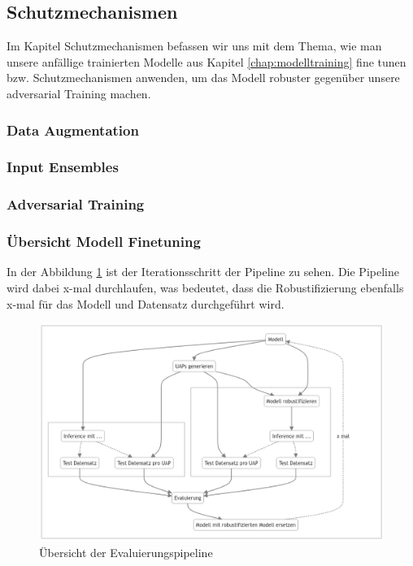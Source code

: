 \subsection{Schutzmechanismen}

Im Kapitel Schutzmechanismen befassen wir uns mit dem Thema, wie man unsere anfällige trainierten Modelle aus Kapitel \ref{chap:modelltraining} fine tunen bzw. Schutzmechanismen anwenden, um das Modell robuster gegenüber unsere adversarial Training machen. 

\subsubsection{Data Augmentation}



\subsubsection{Input Ensembles}


\subsubsection{Adversarial Training}






\subsubsection{Übersicht Modell Finetuning}
In der Abbildung \ref{fig:Evaluierungspipeline} ist der Iterationsschritt der Pipeline zu sehen. Die Pipeline wird dabei x-mal durchlaufen, was bedeutet, dass die Robustifizierung ebenfalls x-mal für das Modell und Datensatz durchgeführt wird.

\begin{figure}[H]
    \centering
    \includegraphics[width=\linewidth]{01-images/04-methodik/pipeline-robustifizierung.png}
    \caption{Übersicht der Evaluierungspipeline}
    \label{fig:Evaluierungspipeline}
\end{figure}

